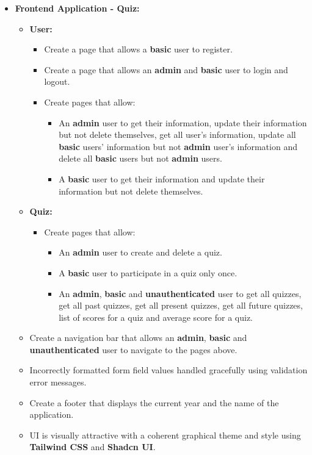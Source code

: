 \documentclass{article}
\begin{document}
\begin{itemize}
	\item \textbf{Frontend Application - Quiz:}
	\begin{itemize}
		\item \textbf{User:}
		\begin{itemize}
			\item Create a page that allows a \textbf{basic} user to register.
			\item Create a page that allows an \textbf{admin} and \textbf{basic} user to login and logout.
			\item Create pages that allow:
			\begin{itemize}
				\item An \textbf{admin} user to get their information, update their information but not delete themselves, get all user's information, update all \textbf{basic} users' information but not \textbf{admin} user's information and delete all \textbf{basic} users but not \textbf{admin} users.
				\item A \textbf{basic} user to get their information and update their information but not delete themselves.
			\end{itemize}
		\end{itemize}
		\item \textbf{Quiz:} 
		\begin{itemize}
			\item Create pages that allow:
			\begin{itemize}
				\item An \textbf{admin} user to create and delete a quiz.
				\item A \textbf{basic} user to participate in a quiz only once.
				\item An \textbf{admin}, \textbf{basic} and \textbf{unauthenticated} user to get all quizzes, get all past quizzes, get all present quizzes, get all future quizzes, list of scores for a quiz and average score for a quiz.
			\end{itemize}
		\end{itemize}
		\item Create a navigation bar that allows an \textbf{admin}, \textbf{basic} and \textbf{unauthenticated} user to navigate to the pages above.
		\item Incorrectly formatted form field values handled gracefully using validation error messages.
		\item Create a footer that displays the current year and the name of the application.
		\item UI is visually attractive with a coherent graphical theme and style using \textbf{Tailwind CSS} and \textbf{Shadcn UI}.
	\end{itemize}


\end{itemize}
\end{document}
